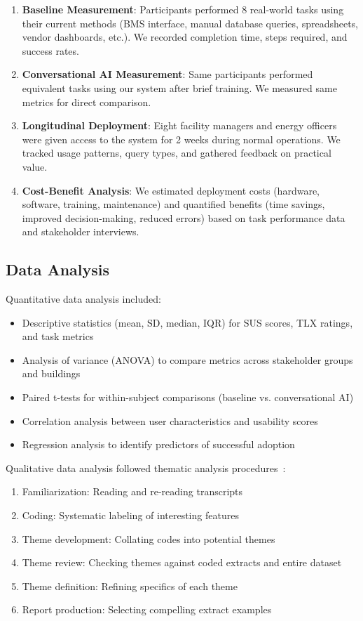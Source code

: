 \documentclass[acmlarge]{acmart}
\begin{document}
\begin{enumerate}
    \item \textbf{Baseline Measurement}: Participants performed 8 real-world tasks using their current methods (BMS interface, manual database queries, spreadsheets, vendor dashboards, etc.). We recorded completion time, steps required, and success rates.
    
    \item \textbf{Conversational AI Measurement}: Same participants performed equivalent tasks using our system after brief training. We measured same metrics for direct comparison.
    
    \item \textbf{Longitudinal Deployment}: Eight facility managers and energy officers were given access to the system for 2 weeks during normal operations. We tracked usage patterns, query types, and gathered feedback on practical value.
    
    \item \textbf{Cost-Benefit Analysis}: We estimated deployment costs (hardware, software, training, maintenance) and quantified benefits (time savings, improved decision-making, reduced errors) based on task performance data and stakeholder interviews.
\end{enumerate}

\subsection{Data Analysis}

Quantitative data analysis included:
\begin{itemize}
    \item Descriptive statistics (mean, SD, median, IQR) for SUS scores, TLX ratings, and task metrics
    \item Analysis of variance (ANOVA) to compare metrics across stakeholder groups and buildings
    \item Paired t-tests for within-subject comparisons (baseline vs. conversational AI)
    \item Correlation analysis between user characteristics and usability scores
    \item Regression analysis to identify predictors of successful adoption
\end{itemize}

Qualitative data analysis followed thematic analysis procedures~\cite{Braun2006}:
\begin{enumerate}
    \item Familiarization: Reading and re-reading transcripts
    \item Coding: Systematic labeling of interesting features
    \item Theme development: Collating codes into potential themes
    \item Theme review: Checking themes against coded extracts and entire dataset
    \item Theme definition: Refining specifics of each theme
    \item Report production: Selecting compelling extract examples
\end{enumerate}
\end{document}

